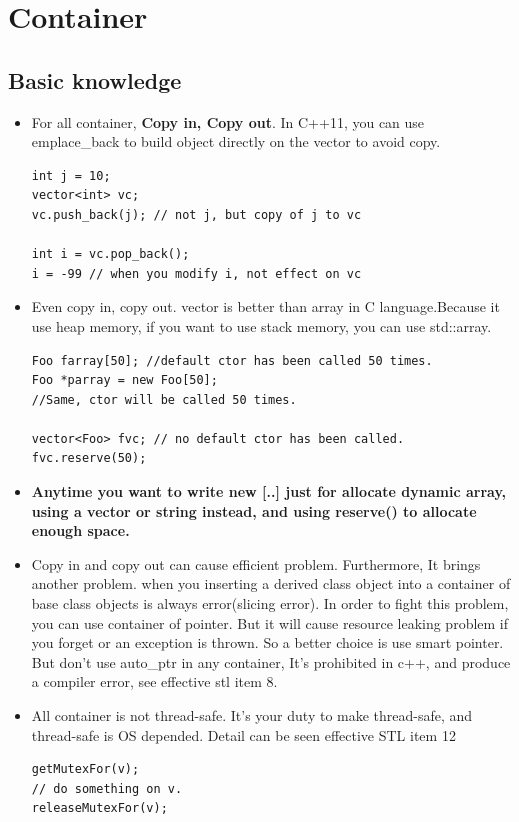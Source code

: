 \documentclass[a4paper,11pt,twoside]{book}
\begin{document}
\section{Container}

\subsection{Basic knowledge}
\begin{itemize}

\item For all container, \textbf{Copy in, Copy out}. In C++11, you can use emplace\_back to build object directly on the vector to avoid copy.
\begin{lstlisting}[numbers=none]
int j = 10;
vector<int> vc;
vc.push_back(j); // not j, but copy of j to vc

int i = vc.pop_back(); 
i = -99 // when you modify i, not effect on vc
\end{lstlisting}

\item Even copy in, copy out. vector is better than array in C language.Because it use heap memory, if you want to use stack memory, you can use std::array.
\begin{lstlisting}[numbers=none]
Foo farray[50]; //default ctor has been called 50 times.
Foo *parray = new Foo[50]; 
//Same, ctor will be called 50 times.

vector<Foo> fvc; // no default ctor has been called.
fvc.reserve(50);
\end{lstlisting}

\item \textbf{Anytime you want to write new [..] just for allocate dynamic array, using a vector or string instead, and using reserve() to allocate enough space.}


\item Copy in and copy out can cause efficient problem. Furthermore, It brings  another problem. when you inserting a derived class object into a container of base class objects is always error(slicing error). In order to fight this problem, you can use container of pointer. But it will cause resource leaking problem if you forget or an exception is thrown. So a better choice is use smart pointer. But don't use auto\_ptr in any container, It's prohibited in c++, and produce a compiler error, see effective stl item 8.

\item All container is not thread-safe. It's your duty to make thread-safe, and thread-safe is OS depended. Detail can be seen effective STL item 12
\begin{lstlisting}[numbers=none]
getMutexFor(v);
// do something on v.
releaseMutexFor(v);
\end{lstlisting}


\end{itemize}
\end{document}
